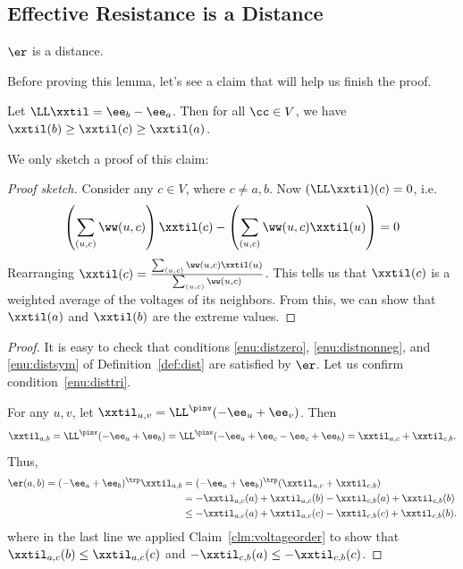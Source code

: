 \subsection{Effective Resistance is a Distance}
\begin{lemma}
  $\er$ is a distance.
\end{lemma}
Before proving this lemma, let's see a claim that will help us finish
the proof.
\begin{claim}
    \label{clm:voltageorder}
    Let $\LL \xxtil = \ee_b - \ee_a$.
    Then for all $\cc \in V$, we have $\xxtil(b) \geq \xxtil(c) \geq \xxtil(a)$.
  \end{claim}
  We only sketch a proof of this claim:
  \begin{proof}[Proof sketch]
    Consider any $c \in V$, where $c\neq a,b$.
    Now $(\LL \xxtil)(c) = 0$, i.e.
    \[
      \left( \sum_{(u,c)} \ww(u,c) \right) \xxtil(c) - \left(
        \sum_{(u,c)} \ww(u,c) \xxtil(u) \right) = 0
    \]
    Rearranging $ \xxtil(c) = \frac{\sum_{(u,c)} \ww(u,c) \xxtil(u)
    }{\sum_{(u,c)} \ww(u,c)}$.
   This tells us that $\xxtil(c)$ is a weighted average of the
   voltages of its neighbors. From this, we can show that $\xxtil(a)$
   and $\xxtil(b)$ are the extreme values.
  \end{proof}
\begin{proof}
  It is easy to check that conditions
  \ref{enu:distzero}, \ref{enu:distnonneg}, and \ref{enu:distsym} of Definition~\ref{def:dist} are satisfied by
  $\er$.
  Let us confirm condition~\ref{enu:disttri}.

  For any $u,v$, let $\xxtil_{u,v} = \LL^\pinv ( -\ee_u + \ee_v )$.
  Then
  \[
    \xxtil_{a,b} = \LL^\pinv ( -\ee_a+ \ee_b)
  =  \LL^\pinv ( -\ee_a + \ee_c - \ee_c  + \ee_b)
  = \xxtil_{a,c} + \xxtil_{c,b}
  .
\]
Thus,
\begin{align*}
  \er(a,b) =  ( -\ee_a+ \ee_b)^\trp \xxtil_{a,b}
  &=  ( -\ee_a+ \ee_b)^\trp(\xxtil_{a,c} + \xxtil_{c,b})
  \\
  &= -\xxtil_{a,c}(a) + \xxtil_{a,c}(b) -\xxtil_{c,b}(a) +
  \xxtil_{c,b}(b)
  \\
   &\leq -\xxtil_{a,c}(a) + \xxtil_{a,c}(c) -\xxtil_{c,b}(c) +
     \xxtil_{c,b}(b).
\end{align*}
where in the last line we applied Claim~\ref{clm:voltageorder} to show
that $\xxtil_{a,c}(b) \leq \xxtil_{a,c}(c)$ and ${ -\xxtil_{c,b}(a) \leq  -\xxtil_{c,b}(c)}$.
\end{proof}



